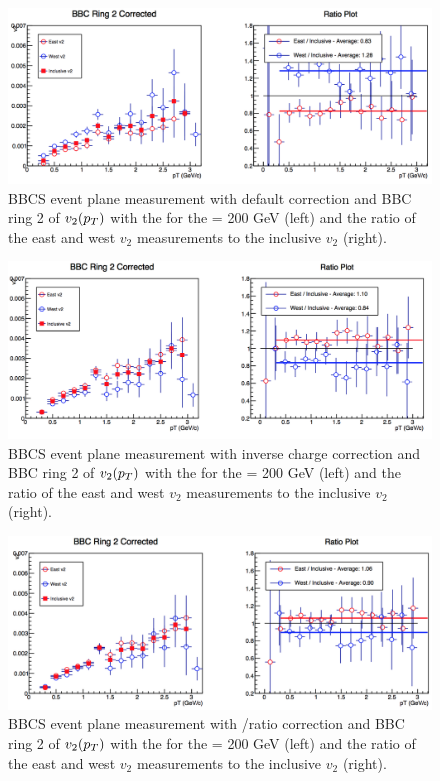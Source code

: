 \begin{figure}

\includegraphics[width=0.65\linewidth]{figs/bbc_2_default.png}
\caption{BBCS event plane measurement with default correction and BBC ring 2 of $v_{2}(\mbox{$p_T$})$ with the  for the \pau \sqsn = 200 GeV (left) and the ratio of the east and west $v_2$ measurements to the inclusive $v_2$ (right).}
\end{figure}

\begin{figure}

\includegraphics[width=0.65\linewidth]{figs/bbc_2_data.png}
\caption{BBCS event plane measurement with inverse charge correction and BBC ring 2 of $v_{2}(\mbox{$p_T$})$ with the  for the \pau \sqsn = 200 GeV (left) and the ratio of the east and west $v_2$ measurements to the inclusive $v_2$ (right).}
\end{figure}

\begin{figure}

\includegraphics[width=0.65\linewidth]{figs/bbc_2_pp.png}
\caption{BBCS event plane measurement with \pp/\pau ratio correction and BBC ring 2 of $v_{2}(\mbox{$p_T$})$ with the  for the \pau \sqsn = 200 GeV (left) and the ratio of the east and west $v_2$ measurements to the inclusive $v_2$ (right).}
\end{figure}

